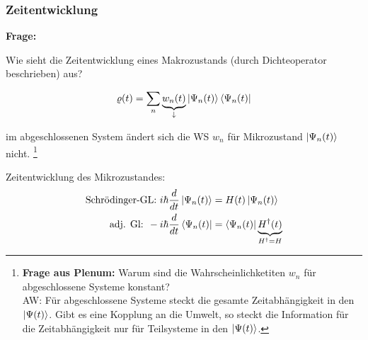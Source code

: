 \subsubsection{Zeitentwicklung}
\textbf{Frage:}
\begin{center}
    Wie sieht die Zeitentwicklung eines Makrozustands (durch Dichteoperator beschrieben) aus?
\end{center}


\begin{equation}
    \varrho(t) = \sum_n \underbrace{w_n(t)}_{\downarrow} \ket{\Psi_n(t)} \bra{\Psi_n(t)} 
\end{equation}

\begin{center}
    \small
    im abgeschlossenen System ändert sich die WS $w_n$ für Mikrozustand $\ket{\Psi_n(t)}$ nicht. \footnote{\textbf{Frage aus Plenum:} Warum sind die Wahrscheinlichketiten $w_n$ für abgeschlossene Systeme konstant? \\
    AW: Für abgeschlossene Systeme steckt die gesamte Zeitabhängigkeit in den $\ket{\Psi (t)}$. Gibt es eine Kopplung an die Umwelt, so steckt die Information für die Zeitabhängigkeit nur für Teilsysteme in den $\ket{\Psi (t)}$.}
\end{center}

\vspace{0.5cm}
Zeitentwicklung des Mikrozustandes:
\begin{align}
    \text{Schrödinger-GL: } i \hbar \frac{d}{dt} \ket{\Psi_n(t)} &= H(t) \ket{\Psi_n(t)} \\
    \text{adj. Gl: } - i \hbar  \frac{d}{dt} \bra{\Psi_n(t)} &=  \bra{\Psi_n(t)} \underbrace{H^{\dag}(t)}_{H^{\dag} = H}
\end{align}

